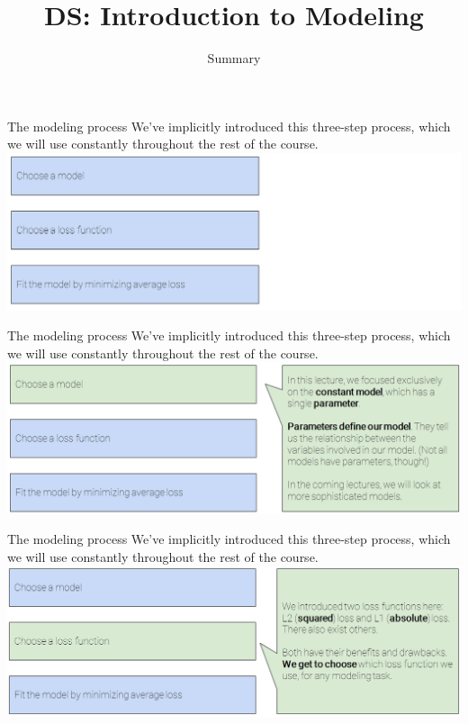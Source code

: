\documentclass[aspectratio=169]{../latex_main/tntbeamer}  %
\title[Introduction]{DS: Introduction to Modeling}
\subtitle{Summary}
\begin{document}
	
	\maketitle
	\begin{frame}{The modeling process}
	    We’ve implicitly introduced this three-step process, which we will use constantly throughout the rest of the course.\\
	    \includegraphics[scale=.4]{Bild47}
	\end{frame}
	
	\begin{frame}{The modeling process}
	    We’ve implicitly introduced this three-step process, which we will use constantly throughout the rest of the course.\\
	    \includegraphics[scale=.4]{Bild48}
	\end{frame}
	
	
	\begin{frame}{The modeling process}
	    We’ve implicitly introduced this three-step process, which we will use constantly throughout the rest of the course.\\
	    \includegraphics[scale=.4]{Bild49}
	\end{frame}
	
\end{document}
